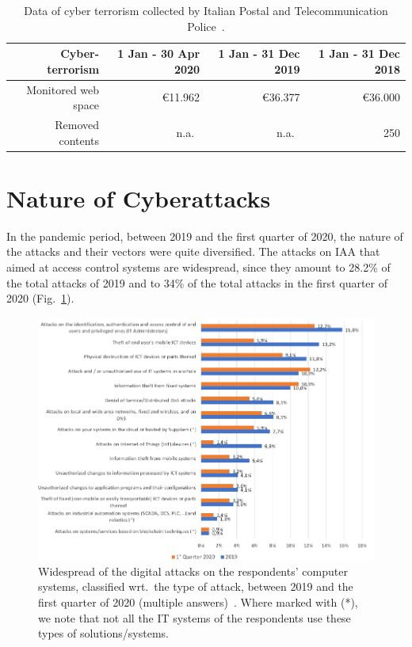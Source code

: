 \documentclass{easychair}
\begin{document}
\begin{table}[ht]
  \begin{center}
	\begin{tabular}{|r|r|r|r|}									
		\hline									
		\textbf{Cyber-terrorism}	&	1 Jan - 30 Apr 2020	&	1 Jan - 31 Dec 2019	&	1 Jan - 31 Dec 2018\\
		\hline									
		Monitored web space	&	\euro 11.962	&	\euro 36.377	&	\euro 36.000\\
		Removed contents 	&	n.a.\	&	n.a.\	&	250\\
		\hline	
	\end{tabular}
        \end{center}
	\caption{Data of cyber terrorism collected by Italian Postal and Telecommunication Police~\cite{oad20}.}									
	\label{tab:table3}									
\end{table}	

\section{Nature of Cyberattacks}\label{sec:TypeAttacks}

In the pandemic period, between 2019 and the first quarter of 2020, the nature of the attacks and their vectors were quite diversified.
The attacks on IAA that aimed at access control systems are widespread, since they amount to 28.2\% of the total attacks
of 2019 and to 34\% of the total attacks in the first quarter of 2020 (Fig.~\ref{fig:5}).

\begin{figure}
  \centering
  \includegraphics[width=1\textwidth]{pictures/fig5.png}
  \caption{Widespread of the digital attacks on the respondents' computer systems, classified wrt.\ the type of attack, between 2019 and the first quarter of 2020 (multiple answers)~\cite{oad20}. Where marked with (*), we note that not all the IT systems of the respondents use these types of solutions/systems.}
  \label{fig:5}
\end{figure}
\end{document}
